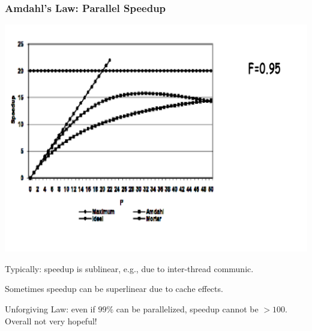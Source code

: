 \documentclass{beamer}
\begin{document}
\begin{frame}[fragile,t]
\frametitle{Amdahl's Law: Parallel Speedup}

\medskip

\includegraphics[width=44ex]{Ch1Figs/ParSpeedup}
\vspace{-5ex}

Typically: speedup is sublinear, e.g., due to inter-thread communic.\medskip 

Sometimes speedup can be superlinear due to cache effects.\medskip
 
\alert{Unforgiving Law: even if $99\%$ can be parallelized, speedup cannot be $> 100$. Overall not very hopeful!}

\end{frame}
\end{document}
